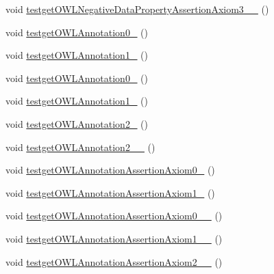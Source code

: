 \begin{DoxyCompactItemize}
\item 
void \hyperlink{classorg_1_1semanticweb_1_1owlapi_1_1api_1_1test_1_1_null_check_test_case_ac2b9656eacca55f99c5eab2eef5399ac}{testget\-O\-W\-L\-Negative\-Data\-Property\-Assertion\-Axiom3\-\_\-\_} ()
\item 
void \hyperlink{classorg_1_1semanticweb_1_1owlapi_1_1api_1_1test_1_1_null_check_test_case_a37b488447a8a1d05f10a6123925ee4a6}{testget\-O\-W\-L\-Annotation0\-\_} ()
\item 
void \hyperlink{classorg_1_1semanticweb_1_1owlapi_1_1api_1_1test_1_1_null_check_test_case_af52a142b05b0a1f71834ffc6130c222f}{testget\-O\-W\-L\-Annotation1\-\_} ()
\item 
void \hyperlink{classorg_1_1semanticweb_1_1owlapi_1_1api_1_1test_1_1_null_check_test_case_a09413b39bb045888938359609ef071e1}{testget\-O\-W\-L\-Annotation0\-\_} ()
\item 
void \hyperlink{classorg_1_1semanticweb_1_1owlapi_1_1api_1_1test_1_1_null_check_test_case_ab4fc4708af1dd0de8e1606a754799778}{testget\-O\-W\-L\-Annotation1\-\_} ()
\item 
void \hyperlink{classorg_1_1semanticweb_1_1owlapi_1_1api_1_1test_1_1_null_check_test_case_a4db59d015b2e871a6a29710dc8f7df75}{testget\-O\-W\-L\-Annotation2\-\_} ()
\item 
void \hyperlink{classorg_1_1semanticweb_1_1owlapi_1_1api_1_1test_1_1_null_check_test_case_a435faebcfe336031cb00f8dd4df7cddc}{testget\-O\-W\-L\-Annotation2\-\_\-\_} ()
\item 
void \hyperlink{classorg_1_1semanticweb_1_1owlapi_1_1api_1_1test_1_1_null_check_test_case_ae4e2782cf81cbac947cf7d3dc1325b5d}{testget\-O\-W\-L\-Annotation\-Assertion\-Axiom0\-\_} ()
\item 
void \hyperlink{classorg_1_1semanticweb_1_1owlapi_1_1api_1_1test_1_1_null_check_test_case_a335d4a25165e3b1a6017a379790a90d1}{testget\-O\-W\-L\-Annotation\-Assertion\-Axiom1\-\_} ()
\item 
void \hyperlink{classorg_1_1semanticweb_1_1owlapi_1_1api_1_1test_1_1_null_check_test_case_a01e5863ffe0812d9e1aeb35a023fe94d}{testget\-O\-W\-L\-Annotation\-Assertion\-Axiom0\-\_\-\_} ()
\item 
void \hyperlink{classorg_1_1semanticweb_1_1owlapi_1_1api_1_1test_1_1_null_check_test_case_a7da8aa56389c3d245ad4beaba1fc4458}{testget\-O\-W\-L\-Annotation\-Assertion\-Axiom1\-\_\-\_} ()
\item 
void \hyperlink{classorg_1_1semanticweb_1_1owlapi_1_1api_1_1test_1_1_null_check_test_case_a4b34beb3b84bdecf00f6d923f11f6211}{testget\-O\-W\-L\-Annotation\-Assertion\-Axiom2\-\_\-\_} ()

\end{DoxyCompactItemize}
